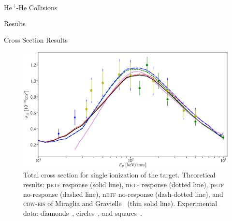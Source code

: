 \documentclass[letterpaper, 11 pt]{report}
\begin{document}
\begin{chapter}{\texorpdfstring{He\textsuperscript{+}}{He+}-He Collisions \label{chap:hephe}}
\begin{section}{Results \label{sec:hephe-disc}}
\begin{subsection}{Cross Section Results \label{sec:hephe-res}}
         \begin{figure}[t]
            \centering
            \includegraphics[width = \linewidth]{./images/hephe-cross/HepHe-111.eps}
            \caption[Total cross section for single ionization of the target in He\textsuperscript{+}-He
                     collisions.]
                    {Total cross section for single ionization of the target.
                     Theoretical results: p\textsc{etf} response (solid line), n\textsc{etf} response
                                          (dotted line), p\textsc{etf} no-response (dashed line),
                                          n\textsc{etf} no-response (dash-dotted line), and
                                          \textsc{cdw-eis} of Miraglia and Gravielle~\cite{MG-10}
                                          (thin solid line).
                     Experimental data: diamonds~\cite{Dub-89}, circles~\cite{FTFHLP-95}, and
                                        squares~\cite{DT-88}.
                     \label{fig:cs111}}
         \end{figure}


\end{subsection}
\end{section}
\end{chapter}
\end{document}
